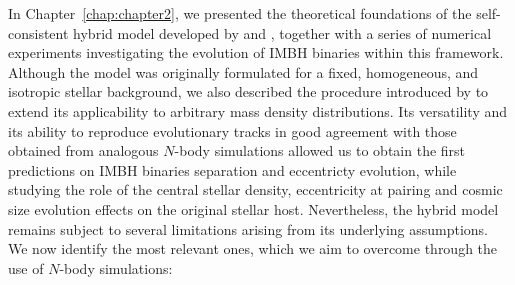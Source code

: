 \documentclass[12pt,twoside,openany]{book}
\begin{document}
In Chapter~\ref{chap:chapter2}, we presented the theoretical foundations of the self-consistent hybrid model developed by \textcite{Quinlan_1996} and \textcite{Sesana_2006}, together with a series of numerical experiments investigating the evolution of IMBH binaries within this framework. Although the model was originally formulated for a fixed, homogeneous, and isotropic stellar background, we also described the procedure introduced by \textcite{Sesana_2015} to extend its applicability to arbitrary mass density distributions. Its versatility and its ability to reproduce evolutionary tracks in good agreement with those obtained from analogous $N$-body simulations allowed us to obtain the first predictions on IMBH binaries separation and eccentricty evolution, while studying the role of the central stellar density, eccentricity at pairing and cosmic size evolution effects on the original stellar host. Nevertheless, the hybrid model remains subject to several limitations arising from its underlying assumptions. We now identify the most relevant ones, which we aim to overcome through the use of $N$-body simulations:
\end{document}
